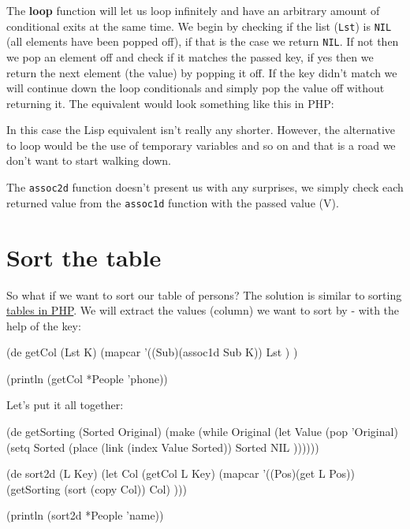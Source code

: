 The \textbf{loop} function will let us loop infinitely and have an
arbitrary amount of conditional exits at the same time. We begin by
checking if the list (\texttt{Lst}) is \texttt{NIL} (all elements have
been popped off), if that is the case we return \texttt{NIL}. If not then we
pop an element off and check if it matches the passed key, if yes then
we return the next element (the value) by popping it off. If the key
didn't match we will continue down the loop conditionals and simply
pop the value off without returning it. The equivalent would look
something like this in PHP:


In this case the Lisp equivalent isn't really any shorter. However, the
alternative to loop would be the use of temporary variables and so on
and that is a road we don't want to start walking down.

The \texttt{assoc2d} function doesn't present us with any surprises, we simply
check each returned value from the \texttt{assoc1d} function with the passed
value (V).


\section{Sort the table}
\label{sec:work-with-tables-sort-the-table}

So what if we want to sort our table of persons? The solution is similar
to sorting
\href{http://www.prodevtips.com/2008/01/06/sorting-2d-arrays-in-php-anectodes-and-reflections/}{tables in PHP}. We will extract the values (column) we want to sort by - with
the help of the key:

\begin{wideverbatim}
(de getCol (Lst K)
    (mapcar '((Sub)(assoc1d Sub K)) Lst ) )
    
(println (getCol *People 'phone))
\end{wideverbatim}

Let's put it all together:


\begin{wideverbatim}
(de getSorting (Sorted Original)
    (make
     (while Original
            (let Value (pop 'Original)
              (setq Sorted 
                    (place 
                     (link (index Value Sorted)) Sorted NIL ))))))

(de sort2d (L Key)  
     (let Col (getCol L Key)
       (mapcar '((Pos)(get L Pos)) (getSorting (sort (copy Col)) Col) )))

(println (sort2d *People 'name))
\end{wideverbatim}

